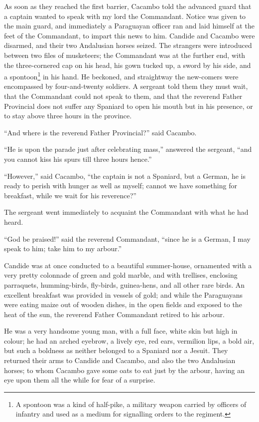 As soon as they reached the first barrier, Cacambo told the advanced guard that a captain wanted to speak with my lord the Commandant. Notice was given to the main guard, and immediately a Paraguayan officer ran and laid himself at the feet of the Commandant, to impart this news to him. Candide and Cacambo were disarmed, and their two Andalusian horses seized. The strangers were introduced between two files of musketeers; the Commandant was at the further end, with the three-cornered cap on his head, his gown tucked up, a sword by his side, and a spontoon\footnote{A spontoon was a kind of half-pike, a military weapon carried by officers of infantry and used as a medium for signalling orders to the regiment.} in his hand. He beckoned, and straightway the new-comers were encompassed by four-and-twenty soldiers. A sergeant told them they must wait, that the Commandant could not speak to them, and that the reverend Father Provincial does not suffer any Spaniard to open his mouth but in his presence, or to stay above three hours in the province.

``And where is the reverend Father Provincial?'' said Cacambo.

``He is upon the parade just after celebrating mass,'' answered the sergeant, ``and you cannot kiss his spurs till three hours hence.''

``However,'' said Cacambo, ``the captain is not a Spaniard, but a German, he is ready to perish with hunger as well as myself; cannot we have something for breakfast, while we wait for his reverence?''

The sergeant went immediately to acquaint the Commandant with what he had heard.

``God be praised!'' said the reverend Commandant, ``since he is a German, I may speak to him; take him to my arbour.''

Candide was at once conducted to a beautiful summer-house, ornamented with a very pretty colonnade of green and gold marble, and with trellises, enclosing parraquets, humming-birds, fly-birds, guinea-hens, and all other rare birds. An excellent breakfast was provided in vessels of gold; and while the Paraguayans were eating maize out of wooden dishes, in the open fields and exposed to the heat of the sun, the reverend Father Commandant retired to his arbour.

He was a very handsome young man, with a full face, white skin but high in colour; he had an arched eyebrow, a lively eye, red ears, vermilion lips, a bold air, but such a boldness as neither belonged to a Spaniard nor a Jesuit. They returned their arms to Candide and Cacambo, and also the two Andalusian horses; to whom Cacambo gave some oats to eat just by the arbour, having an eye upon them all the while for fear of a surprise.

